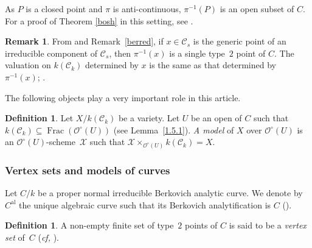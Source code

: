 \documentclass[JEP,XML,SOM,Unicode,NoFloatCountersInSection,published]{cedram}
\newcommand{\al}{\mathrm{al}}
\DeclareMathOperator{\Frac}{Frac}
\theoremstyle{definition}
\newtheorem{defn}[thm]{Definition}
\newtheorem{rem}[thm]{Remark}
\begin{document}
As $P$ is a closed point and $\pi$ is anti-continuous, $\pi^{-1}(P)$ is an open subset of $C$. For a proof of Theorem \ref{bosh} in this setting, see \cite[Prop.\,4.5]{une}.

\begin{rem} \label{0.2}
From \cite[Prop.\,2.4.4]{Ber90} and Remark~\ref{berred}, if $x \in \mathscr{C}_s$ is the generic point of an irreducible component of $\mathscr{C}_s$, then $\pi^{-1}(x)$ is a single type~$2$ point of $C$. The valuation on $k(\mathscr{C}_k)$ determined by $x$ is the same as that determined by $\pi^{-1}(x)$; \cf \cite[Lem.\,4.3]{une}.
\end{rem}

\pagebreak[2]
The following objects play a very important role in this article.

\begin{defn} \label{modO}
Let $X/k(\mathscr{C}_k)$ be a variety.
Let $U$ be an open of $C$ such that $k(\mathscr{C}_k) \subseteq \Frac(\mathcal{O}^{\circ}(U))$ (\eg see Lemma~\ref{1.5.1}). \emph{A model} of $X$ over $\mathcal{O}^{\circ}(U)$ is an $\mathcal{O}^{\circ}(U)$-scheme~$\mathcal{X}$ such that ${\mathcal{X} \times_{\mathcal{O}^{\circ}(U)} k(\mathscr{C}_k)=X}$.
\end{defn}

\subsubsection{Vertex sets and models of curves}

Let $C/k$ be a proper normal irreducible Berkovich analytic curve. We denote by $C^{\al}$ the unique algebraic curve such that its Berkovich analytification is $C$ (\cf \cite[Th.\,3.7.2]{duc}).

\begin{defn} \label{virtuals} A non-empty finite set of type~$2$ points of $C$ is said to be a \emph{vertex set} of~$C$ (\emph{cf,} \cite[6.3.17]{duc}).
\end{defn}
\end{document}
